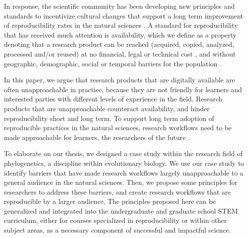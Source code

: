 \documentclass[12pt]{article}
\begin{document}
In response, the scientific community has been developing new principles and standards to incentivize cultural changes that support a long term improvement of reproducibility rates in the natural sciences \citep{peng2015reproducibility, wilkinson2016fair, miyakawa2020no}.
A standard for reproducibility that has received much attention is availability, which we define as a property denoting that a research product can be reached (acquired, copied, analyzed, processed and/or reused) at no financial, legal or technical cost \citep{arnold2019turing}, and without geographic, demographic, social or temporal barriers for the population \citep{fecher2014open}.

In this paper, we argue that research products that are digitally available are often unapproachable in practice, because they are not friendly for learners and interested parties with different levels of experience in the field.
Research products that are unapproachable counteract availability, and hinder reproducibility short and long term.
To support long term adoption of reproducible practices in the natural sciences, research workflows need to be made approachable for learners, the researchers of the future \citep{roland2002think}.

To elaborate on our thesis, we designed a case study within the research field of phylogenetics, a discipline within evolutionary biology.
We use our case study to identify barriers that have made research workflows largely unapproachable to a general audience in the natural sciences.
Then, we propose some principles for researchers to address these barriers, and create research workflows that are reproducible by a larger audience.
The principles proposed here can be generalized and integrated into the undergraduate and graduate school STEM curriculum, either for courses specialized in reproducibility or within other subject areas, as a necessary component of successful and impactful science.
\end{document}
